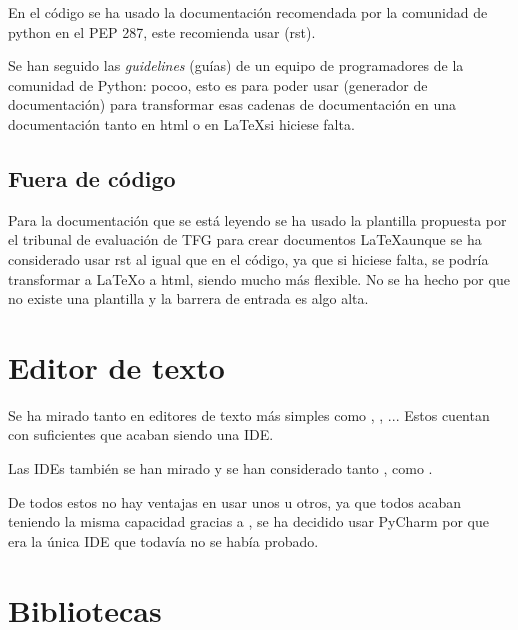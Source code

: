 En el código se ha usado la documentación recomendada por la comunidad de python en el PEP 287\cite{pep287}, este recomienda usar  (rst).

Se han seguido las \emph{guidelines} (guías) de un equipo de programadores de la comunidad de Python: pocoo\cite{pocoo}, esto es para poder usar  (generador de documentación) para transformar esas cadenas de documentación en una documentación tanto en html o en \LaTeX  si hiciese falta.

\subsection{Fuera de código}

Para la documentación que se está leyendo se ha usado la plantilla propuesta por el tribunal de evaluación de TFG para crear documentos \LaTeX aunque se ha considerado usar rst al igual que en el código, ya que si hiciese falta, se podría transformar a \LaTeX o a html, siendo mucho más flexible. No se ha hecho por que no existe una plantilla y la barrera de entrada es algo alta.


\section{Editor de texto}

Se ha mirado tanto en editores de texto más simples como , , ... Estos cuentan con suficientes  que acaban siendo una IDE.

Las IDEs también se han mirado y se han considerado tanto ,  como .

De todos estos no hay ventajas en usar unos u otros, ya que todos acaban teniendo la misma capacidad gracias a , se ha decidido usar PyCharm por que era la única IDE que todavía no se había probado.


\section{Bibliotecas}

